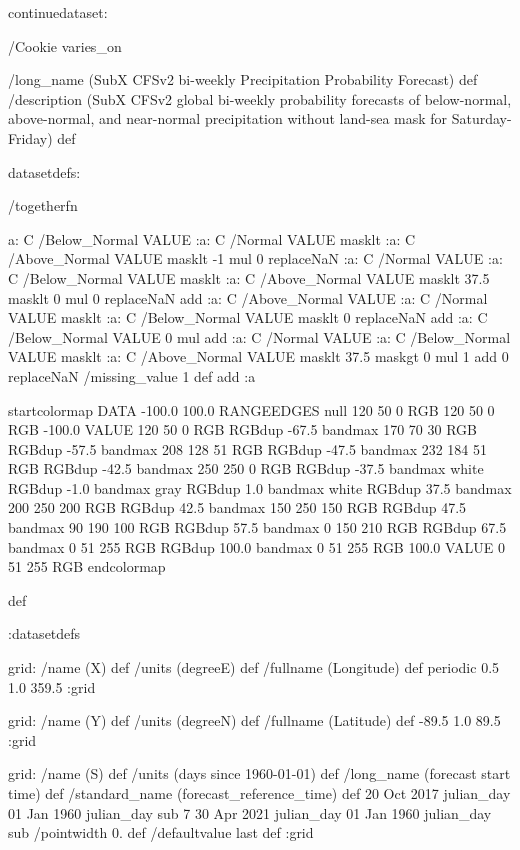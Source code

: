 \begin{ingrid}

continuedataset:


/Cookie varies_on


/long_name (SubX CFSv2 bi-weekly Precipitation Probability Forecast) def
/description (SubX CFSv2 global bi-weekly probability forecasts of below-normal, above-normal, and near-normal precipitation without land-sea mask for Saturday-Friday) def

datasetdefs:

/togetherfn {
 a:
    C /Below_Normal VALUE
    :a:
     C /Normal VALUE
     masklt
    :a:
     C /Above_Normal VALUE
     masklt
    -1 mul
    0 replaceNaN
    :a:
     C /Normal VALUE
     :a:
      C /Below_Normal VALUE
      masklt
     :a:
      C /Above_Normal VALUE
      masklt
     37.5 masklt
     0 mul
     0 replaceNaN           
     add
    :a:
     C /Above_Normal VALUE
     :a:
      C /Normal VALUE
      masklt
     :a:
      C /Below_Normal VALUE
      masklt
     0 replaceNaN
     add
 :a:
     C /Below_Normal VALUE
     0 mul
     add
    :a:
     C /Normal VALUE
     :a:
      C /Below_Normal VALUE
      masklt
     :a:
      C /Above_Normal VALUE        
      masklt
     37.5 maskgt
     0 mul
     1 add
     0 replaceNaN
     /missing_value 1 def
     add
    :a

startcolormap
DATA -100.0 100.0 RANGEEDGES
null 120 50 0 RGB
120 50 0 RGB -100.0 VALUE
120 50 0 RGB RGBdup -67.5 bandmax
170 70 30 RGB RGBdup -57.5 bandmax
208 128 51 RGB RGBdup -47.5 bandmax
232 184 51 RGB RGBdup -42.5 bandmax
250 250 0 RGB RGBdup -37.5 bandmax
white RGBdup -1.0 bandmax
gray RGBdup 1.0 bandmax
white RGBdup 37.5 bandmax
200 250 200 RGB RGBdup 42.5 bandmax
150 250 150 RGB RGBdup 47.5 bandmax
90 190 100 RGB RGBdup 57.5 bandmax
0 150 210 RGB RGBdup 67.5 bandmax
0 51 255 RGB RGBdup 100.0 bandmax
0 51 255 RGB 100.0 VALUE
0 51 255 RGB
endcolormap
} def 

:datasetdefs


grid:
/name (X) def
/units (degreeE) def
/fullname (Longitude) def
periodic
0.5 1.0 359.5
:grid

grid:
/name (Y) def
/units (degreeN) def
/fullname (Latitude) def
-89.5 1.0 89.5
:grid


grid:
/name (S) def
/units (days since 1960-01-01) def
/long_name (forecast start time) def
/standard_name (forecast_reference_time) def
20 Oct 2017 julian_day 01 Jan 1960 julian_day sub
7
30 Apr 2021 julian_day 01 Jan 1960 julian_day sub
/pointwidth 0. def
/defaultvalue { last } def
:grid


\end{ingrid}
